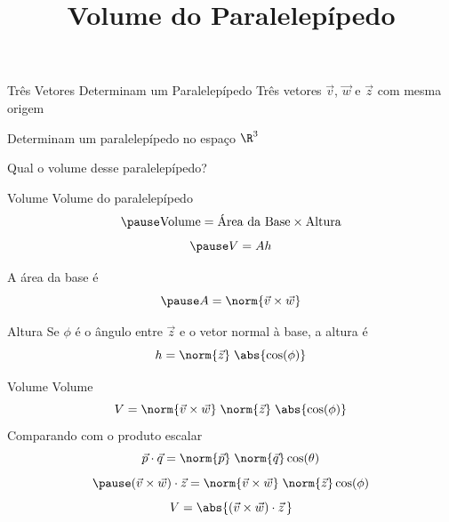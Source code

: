 \documentclass[fleqn,aspectratio=169,12pt]{beamer}
\title{Volume do Paralelepípedo}
\begin{document}
\addtitle

\begin{frame}{Três Vetores Determinam um Paralelepípedo}
  Três vetores
  \(
    \vec{v}
  \),
  \(
    \vec{w}
  \) e
  \(
    \vec{z}
  \)
  com mesma origem

  \pause
  \bigskip
  Determinam um paralelepípedo no espaço $\R^3$

  \pause
  \bigskip
  Qual o volume desse paralelepípedo?
\end{frame}


\begin{frame}{Volume}
  Volume do paralelepípedo
  \[
    \pause
    \text{Volume} = \text{Área da Base} \times \text{Altura}
  \]
  \[
    \pause
    V = Ah
  \]

  \pause
  A área da base é
  \[
    \pause
    A = \norm{\vec{v}\times\vec{w}}
  \]
\end{frame}


\begin{frame}{Altura}
  Se $\phi$ é o ângulo entre $\vec{z}$ e o vetor normal à base, a altura é
  \[
    h = \norm{\vec{z}} \; \abs{\cos(\phi)}
  \]
\end{frame}

\begin{frame}{Volume}
  Volume
  \[
    V = \norm{\vec{v}\times\vec{w}} \; \norm{\vec{z}} \; \abs{\cos(\phi)}
  \]
  \pause
  Comparando com o produto escalar
  \[
    \vec{p} \cdot \vec{q} = \norm{\vec{p}} \; \norm{\vec{q}} \cos(\theta)
  \]
  \[
    \pause
    (\vec{v}\times\vec{w}) \cdot \vec{z} = \norm{\vec{v}\times\vec{w}} \; \norm{\vec{z}} \cos(\phi)
  \]
  \pause
  \[
    V = \abs{(\vec{v}\times\vec{w}) \cdot \vec{z}\,}
  \]
\end{frame}
\end{document}
